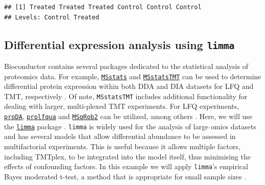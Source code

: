 \documentclass[9pt,a4paper,]{extarticle}
\newenvironment{Shaded}{\begin{snugshade}}{\end{snugshade}}
\newcommand{\AttributeTok}[1]{\textcolor[rgb]{0.13,0.29,0.53}{#1}}
\newcommand{\FunctionTok}[1]{\textcolor[rgb]{0.13,0.29,0.53}{\textbf{#1}}}
\newcommand{\NormalTok}[1]{#1}
\newcommand{\OtherTok}[1]{\textcolor[rgb]{0.56,0.35,0.01}{#1}}
\newcommand{\SpecialCharTok}[1]{\textcolor[rgb]{0.81,0.36,0.00}{\textbf{#1}}}
\newcommand{\StringTok}[1]{\textcolor[rgb]{0.31,0.60,0.02}{#1}}
\begin{document}
\begin{verbatim}
## [1] Treated Treated Treated Control Control Control
## Levels: Control Treated
\end{verbatim}

\begin{Shaded}
\end{Shaded}

\hypertarget{differential-expression-analysis-using-limma}{%
\subsection{\texorpdfstring{Differential expression analysis using \texttt{limma}}{Differential expression analysis using limma}}\label{differential-expression-analysis-using-limma}}

Bioconductor contains several packages dedicated to the statistical analysis of
proteomics data. For example, \href{https://bioconductor.org/packages/3.15/bioc/html/MSstats.html}{\texttt{MSstats}}
and \href{https://bioconductor.org/packages/3.15/bioc/html/MSstatsTMT.html}{\texttt{MSstatsTMT}}
can be used to determine differential protein expression within both DDA and DIA
datasets for LFQ and TMT, respectively \citep{Choi2014, Huang2020}. Of note,
\texttt{MSstatsTMT} includes additional functionality for dealing with larger,
multi-plexed TMT experiments. For LFQ experiments,
\href{https://bioconductor.org/packages/release/bioc/html/proDA.html}{\texttt{proDA}},
\href{https://rdrr.io/github/wolski/prolfqua/}{\texttt{prolfqua}} and
\href{https://www.bioconductor.org/packages/release/bioc/html/msqrob2.html}{\texttt{MSqRob2}}
can be utilized, among others \citep{Goeminne2020, Wolski2023}. Here, we will use the
\href{https://bioconductor.org/packages/release/bioc/html/limma.html}{\texttt{limma}}
package \citep{Ritchie2015}. \texttt{limma} is widely used for the analysis of large omics
datasets and has several models that allow differential abundance to be assessed
in multifactorial experiments. This is useful because it allows multiple factors,
including TMTplex, to be integrated into the model itself, thus minimising the
effects of confounding factors. In this example we will apply \texttt{limma}'s
empirical Bayes moderated t-test, a method that is appropriate for small sample
sizes \citep{Smyth2004}.
\end{document}
